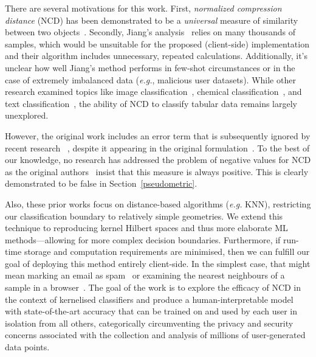 \documentclass[preprint,12pt]{elsarticle}
\begin{document}
There are several motivations for this work. 
First, \textit{normalized compression distance} (NCD) has been demonstrated to be a \textit{universal} measure of similarity between two objects~\cite{ncd}.
Secondly, Jiang's analysis~\cite{jiang2022less} relies on many thousands of samples, which would be unsuitable for the proposed (client-side) implementation and their algorithm includes unnecessary, repeated calculations. 
Additionally, it's unclear how well Jiang's method performs in few-shot circumstances or in the case of extremely imbalanced data (\textit{e.g.}, malicious user datasets). 
While other research examined topics like image classification~\cite{opitz2023gzip}, chemical classification~\cite{weinreich2023parameter}, and text classification~\cite{nishida2011tweet}, the ability of NCD to classify tabular data remains largely unexplored.

However, the original work includes an error term that is subsequently ignored by recent research ~\cite{opitz2023gzip,weinreich2023parameter,nishida2011tweet,jiang2022less}, despite it appearing in the original formulation~\cite{ncd}.
To the best of our knowledge, no research has addressed the problem of negative values for NCD as the original authors~\cite{ncd} insist that this measure is always positive. %
This is clearly demonstrated to be false in Section~\ref{pseudometric}.

Also, these prior works focus on distance-based algorithms  (\textit{e.g.} KNN), restricting our classification boundary to relatively simple geometries.
We extend this technique to reproducing kernel Hilbert spaces and thus more elaborate ML methods---allowing for more complex decision boundaries.
Furthermore, if run-time storage and computation requirements are minimised, then we can fulfill our goal of deploying this method entirely client-side.
In the simplest case, that might mean marking an email as spam~\cite{ansuz_email} or examining the nearest neighbours of a sample in a browser~\cite{ansuz_browser}.
The goal of the work is to explore the efficacy of NCD in the context of kernelised classifiers and produce a human-interpretable model with state-of-the-art accuracy that can be trained on and used by each user in isolation from all others, categorically circumventing the privacy and security concerns associated with the collection and analysis of millions of user-generated data points.
\end{document}

